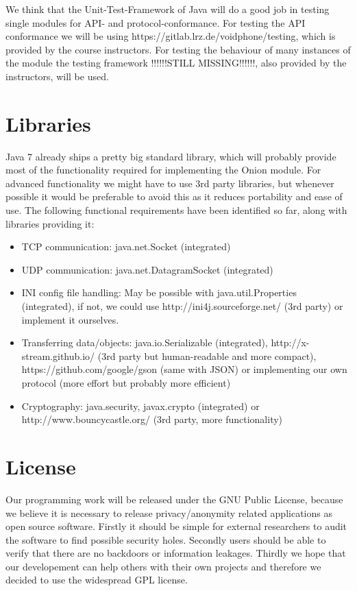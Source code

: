 \documentclass{article}
\begin{document}
We think that the Unit-Test-Framework of Java will do a good job in testing
single modules for API- and protocol-conformance. For testing the API conformance we will be using https://gitlab.lrz.de/voidphone/testing, which is provided by the course instructors. For testing the behaviour of
many instances of the module the testing framework !!!!!!STILL MISSING!!!!!!, also provided by the instructors, will be used.

\section{Libraries}
Java 7 already ships a pretty big standard library, which will probably provide most of the functionality required for implementing the Onion module. For advanced functionality we might have to use 3rd party libraries, but whenever possible it would be preferable to avoid this as it reduces portability and ease of use. 
The following functional requirements have been identified so far, along with libraries providing it:
\begin{itemize}
\item TCP communication: java.net.Socket (integrated)
\item UDP communication: java.net.DatagramSocket (integrated)
\item INI config file handling: May be possible with java.util.Properties (integrated), if not, we could use http://ini4j.sourceforge.net/ (3rd party) or implement it ourselves.
\item Transferring data/objects: java.io.Serializable (integrated), http://x-stream.github.io/ (3rd party but human-readable and more compact), https://github.com/google/gson (same with JSON) or implementing our own protocol (more effort but probably more efficient)
\item Cryptography: java.security, javax.crypto (integrated) or http://www.bouncycastle.org/ (3rd party, more functionality)
\end{itemize}



\section{License}
Our programming work will be released under the GNU Public License, because we
believe it is necessary to release privacy/anonymity related applications as
open source software. Firstly it should be simple for external researchers to
audit the software to find possible security holes. Secondly users should be
able to verify that there are no backdoors or information leakages. Thirdly we
hope that our developement can help others with their own projects and
therefore we decided to use the widespread GPL license.
\end{document}
